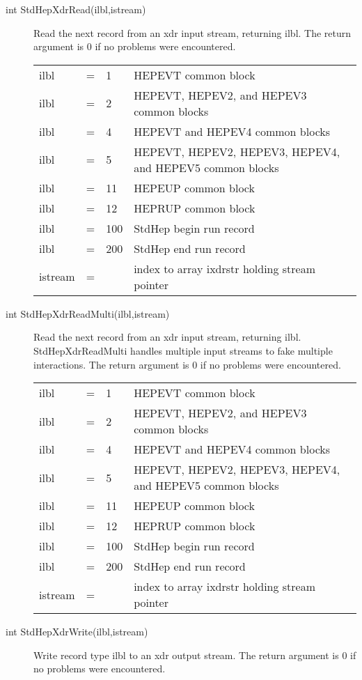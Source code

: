 \begin{description}
\item[int StdHepXdrRead(ilbl,istream)] 
 Read the next record from an xdr input stream, returning ilbl.
 The return argument is 0 if no problems were encountered.

\begin{tabular}{lcll}
ilbl & = & 1   & HEPEVT common block \\
ilbl & = & 2   & HEPEVT, HEPEV2, and HEPEV3 common blocks \\
ilbl & = & 4   & HEPEVT and HEPEV4 common blocks \\
ilbl & = & 5   & HEPEVT, HEPEV2, HEPEV3, HEPEV4, and HEPEV5 common blocks \\
ilbl & = & 11  & HEPEUP common block \\
ilbl & = & 12  & HEPRUP common block \\
ilbl & = & 100 & StdHep begin run record \\
ilbl & = & 200 & StdHep end run record \\
istream & = &  & index to array ixdrstr holding stream pointer \\
\end{tabular}

\item[int StdHepXdrReadMulti(ilbl,istream)]
 Read the next record from an xdr input stream, returning ilbl.
 StdHepXdrReadMulti handles multiple input streams to fake 
 multiple interactions.
 The return argument is 0 if no problems were encountered.

\begin{tabular}{lcll}
ilbl & = & 1   & HEPEVT common block \\
ilbl & = & 2   & HEPEVT, HEPEV2, and HEPEV3 common blocks \\
ilbl & = & 4   & HEPEVT and HEPEV4 common blocks \\
ilbl & = & 5   & HEPEVT, HEPEV2, HEPEV3, HEPEV4, and HEPEV5 common blocks \\
ilbl & = & 11  & HEPEUP common block \\
ilbl & = & 12  & HEPRUP common block \\
ilbl & = & 100 & StdHep begin run record \\
ilbl & = & 200 & StdHep end run record \\
istream & = &  & index to array ixdrstr holding stream pointer \\
\end{tabular}

\item[int StdHepXdrWrite(ilbl,istream)]
 Write record type ilbl to an xdr output stream.
 The return argument is 0 if no problems were encountered.


\end{description}
